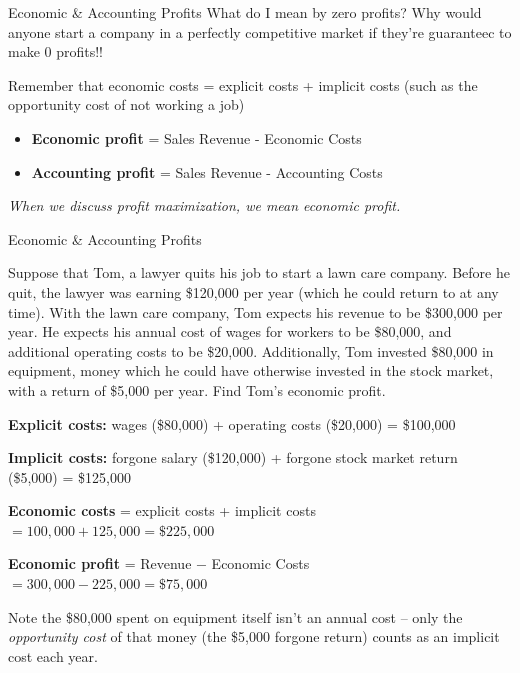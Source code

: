 \documentclass{beamer}
\begin{document}
\begin{frame}{Economic \& Accounting Profits}
  What do I mean by zero profits? Why would anyone start a company in a perfectly competitive market if they're guaranteec to make 0 profits!!

  \bigskip
  Remember that economic costs = explicit costs + implicit costs (such as the opportunity cost of not working a job)

  \begin{itemize}
    \item \textbf{Economic profit} = Sales Revenue - Economic Costs
    
    \item \textbf{Accounting profit} = Sales Revenue - Accounting Costs
  \end{itemize}


  \bigskip
  \emph{When we discuss profit maximization, we mean economic profit.}
\end{frame}

\begin{frame}{Economic \& Accounting Profits}

  Suppose that Tom, a lawyer quits his job to start a lawn care company. Before he quit, the lawyer was earning \$120,000 per year (which he could return to at any time). With the lawn care company, Tom expects his revenue to be \$300,000 per year. He expects his annual cost of wages for workers to be \$80,000, and additional operating costs to be \$20,000. Additionally, Tom invested \$80,000 in equipment, money which he could have otherwise invested in the stock market, with a return of \$5,000 per year. Find Tom's economic profit.
\end{frame}

\begin{frame}

  \textbf{Explicit costs:} wages (\$80,000) + operating costs (\$20,000) = \$100,000

  \bigskip
  \textbf{Implicit costs:} forgone salary (\$120,000) + forgone stock market return (\$5,000) = \$125,000

  \bigskip
  \textbf{Economic costs} = explicit costs + implicit costs $= 100{,}000 + 125{,}000 = \$225{,}000$

  \bigskip
  \textbf{Economic profit} = Revenue $-$ Economic Costs $= 300{,}000 - 225{,}000 = \$75{,}000$

  \bigskip
  Note the \$80,000 spent on equipment itself isn't an annual cost -- only the \emph{opportunity cost} of that money (the \$5,000 forgone return) counts as an implicit cost each year.
\end{frame}
\end{document}
